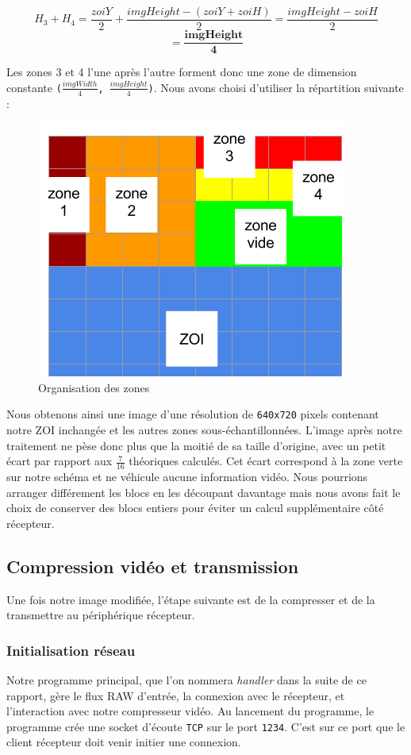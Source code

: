 \documentclass[11pt,a4paper]{article}
\begin{document}
$$ H_3 + H_4 = \frac{zoiY}{2} + \frac{imgHeight-(zoiY+zoiH)}{2} = \frac{imgHeight - zoiH}{2} $$
$$ = \mathbf{\frac{imgHeight}{4}} $$

\bigbreak
Les zones 3 et 4 l'une après l'autre forment donc une zone de dimension constante \texttt{($\frac{imgWidth}{4}$, $\frac{imgHeight}{4}$)}.
Nous avons choisi d'utiliser la répartition suivante :

\begin{figure}[H]
\begin{center}
\includegraphics[scale=0.4]{images/decoupage2.png}
\end{center}
\caption{Organisation des zones}
\label{}
\end{figure}

\bigbreak
Nous obtenons ainsi une image d'une résolution de \texttt{640x720} pixels contenant notre ZOI inchangée et les autres zones sous-échantillonnées.
L'image après notre traitement ne pèse donc plus que la moitié de sa taille d'origine, avec un petit écart par rapport aux $\frac{7}{16}$ théoriques calculés.
Cet écart correspond à la zone verte sur notre schéma et ne véhicule aucune information vidéo.
Nous pourrions arranger différement les blocs en les découpant davantage mais nous avons fait le choix de conserver des blocs entiers pour éviter un calcul supplémentaire côté récepteur.

\subsection{Compression vidéo et transmission}
Une fois notre image modifiée, l'étape suivante est de la compresser et de la transmettre au périphérique récepteur.

\subsubsection{Initialisation réseau}
Notre programme principal, que l'on nommera \textit{handler} dans la suite de ce rapport, gère le flux RAW d'entrée, la connexion avec le récepteur, et l'interaction avec notre compresseur vidéo.
Au lancement du programme, le programme crée une socket d'écoute \texttt{TCP} sur le port \texttt{1234}.
C'est sur ce port que le client récepteur doit venir initier une connexion.
\end{document}
